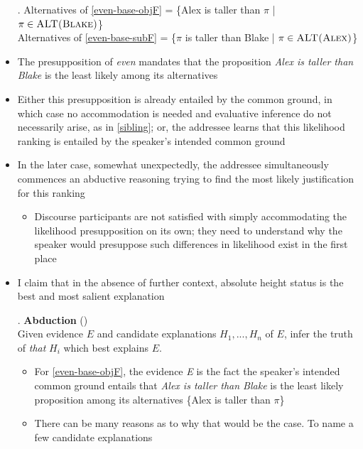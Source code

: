 \documentclass[11pt,letterpaper]{scrartcl}
\begin{document}
\begin{itemize}
    \ex. Alternatives of \ref{even-base-objF} =  \{Alex is taller than $\pi$ | $\pi \in \textsc{ALT(Blake)}$\} \\
    Alternatives of \ref{even-base-subF} =  \{$\pi$ is taller than Blake | $\pi \in \textsc{ALT(Alex)}$\}
    
    \item The presupposition of \textit{even} mandates that the proposition \textit{Alex is taller than Blake} is the least likely among its alternatives
    
    \item Either this presupposition is already entailed by the common ground, in which case no accommodation is needed and evaluative inference do not necessarily arise, as in \ref{sibling}; or, the addressee learns that this likelihood ranking is entailed by the speaker's intended common ground
    
    \item In the later case, somewhat unexpectedly, the addressee simultaneously commences an abductive reasoning trying to find the most likely justification for this ranking
    
    \begin{itemize}
        \item Discourse participants are not satisfied with simply accommodating the likelihood presupposition on its own; they need to understand why the speaker would presuppose such differences in likelihood exist in the first place
    \end{itemize}
    
    \item I claim that in the absence of further context, absolute height status is the best and most salient explanation
    
    \ex. \textbf{Abduction} (\cite{douven_abduction_2017}) \\ Given evidence $E$ and candidate explanations $H_1, ..., H_n$ of $E$, infer the truth of \textit{that} $H_i$ which best explains $E$.
    
    \begin{itemize}
        \item For \ref{even-base-objF}, the evidence \textit{E} is the fact the speaker's intended common ground entails that \textit{Alex is taller than Blake} is the least likely proposition among its alternatives \{Alex is taller than $\pi$\}
        
        \item There can be many reasons as to why that would be the case. To name a few candidate explanations
        

\end{itemize}
\end{itemize}
\end{document}
